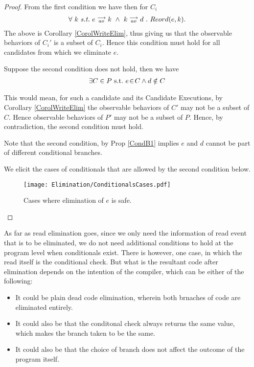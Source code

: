     \begin{proof}
    
        From the first condition we have then for $C_i$
        \begin{align*}
            \forall \ k \ \textit{s.t.} \ 
            \reln{e}{ao}{k} \ \wedge \ \reln{k}{ao}{d} \ . \ 
            Reord(e,k).
        \end{align*}
        The above is Corollary \ref{CorolWriteElim}, thus giving us that the observable behaviors of $C_i'$ is a subset of $C_i$. Hence this condition must hold for all candidates from which we eliminate $e$. 
    
        Suppose the second condition does not hold, then we have 
        \begin{align*}
            \exists C \in P \ \text{s.t.} \  e\!\in\!C \wedge d \notin C
        \end{align*}
    
        This would mean, for such a candidate and its Candidate Executions, by Corollary \ref{CorolWriteElim} the observable behaviors of $C'$ may not be a subset of $C$. 
        Hence observable behaviors of $P'$ may not be a subset of $P$.
        Hence, by contradiction, the second condition must hold. 
    
        Note that the second condition, by Prop \ref{CondB1} implies $e$ and $d$ cannot be part of different conditional branches.
        
        We elicit the cases of conditionals that are allowed by the second condition below.
    
        \begin{figure}[H]
            \centering
            \texttt{[image: Elimination/ConditionalsCases.pdf]}
            \caption{Cases where elimination of $e$ is safe.}
        \end{figure}
    
    \end{proof}
    
    As far as read elimination goes, since we only need the information of read event that is to be eliminated, we do not need additional conditions to hold at the program level when conditionals exist. 
    There is however, one case, in which the read itself is the conditional check. 
    But what is the resultant code after elimination depends on the intention of the compiler, which can be either of the following:
    \begin{itemize}
        \item It could be plain dead code elimination, wherein both brnaches of code are eliminated entirely. 
        \item It could also be that the conditonal check always returns the same value, which makes the branch taken to be the same. 
        \item It could also be that the choice of branch does not affect the outcome of the program itself. 
    \end{itemize}
    
